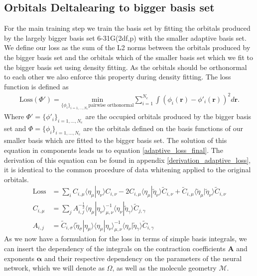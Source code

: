 \subsection{Orbitals Deltalearing to bigger basis set}
For the main training step we train the basis set by fitting the orbitals produced by the largely bigger basis set 6-31G(2df,p) with the smaller adaptive basis set.
We define our loss as the sum of the L2 norms between the orbitals produced by the bigger basis set and the orbitals which of the smaller basis set which we fit to the bigger basis set using density fitting.
As the orbitals should be orthonormal to each other we also enforce this property during density fitting.
The loss function is defined as
\begin{align}
    \text{Loss}(\Phi') = \underset{\{\phi_i\}_{i=1,...,N_e} \text{pairwise orthonormal}}{\text{min}}\sum\limits_{i=1}^{N_e} \int (\phi_i(\mathbf{r})-\phi'_i(\mathbf{r}))^2 d\mathbf{r}.
\end{align}
Where $\Phi' = \{\phi'_i\}_{i=1,...,N_e}$ are the occupied orbitals produced by the bigger basis set and $\Phi = \{\phi_i\}_{i=1,...,N_e}$ are the orbitals defined on the basis functions of our smaller basis  which are fitted to the bigger basis set.
The solution of this equation in components leads us to equation \eqref{adaptive_loss_final}.
The derivation of this equation can be found in appendix \ref{derivation_adaptive_loss}, it is identical to the common procedure of data whitening applied to the original orbitals.
\begin{align}\label{adaptive_loss_final}
    \text{Loss} &= \sum_i C_{i,\mu} \langle\eta_\mu|\eta_\nu\rangle C_{i,\nu} - 2 C_{i,\mu} \langle\eta_\mu|\tilde\eta_\nu\rangle \tilde C_{i,\nu} + \tilde C_{i,\mu} \langle\tilde \eta_\mu|\tilde \eta_\nu\rangle \tilde C_{i,\nu}\\
     C_{i,\mu}&= \sum_{j} A^{-\frac{1}{2}}_{i,j} \langle\eta_\mu|\eta_\nu\rangle^{-1}_{\mu,\nu} \langle\eta_\nu|\tilde\eta_\gamma\rangle \tilde C_{j,\gamma}\\
    A_{i,j}&=\tilde C_{i,\sigma}\langle\tilde \eta_\sigma|\eta_\mu\rangle \langle\eta_\mu|\eta_\nu\rangle^{-1}_{\mu,\nu} \langle\eta_\nu|\tilde\eta_\gamma\rangle \tilde C_{i,\gamma}
\end{align}
As we now have a formulation for the loss in terms of simple basis integrals, we can insert the dependency of the integrals on the contraction coefficients $\mathbf{A}$ and exponents $\mathbf{\alpha}$ and their respective dependency on the parameters of the neural network, which we will denote as $\Omega$, as well as the molecule geometry $\mathcal{M}$.\\

